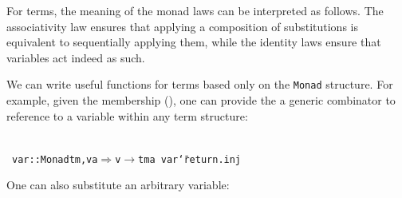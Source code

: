 \documentclass[9pt,authoryear]{sigplanconf}
\begin{document}
%
For terms, the meaning of the monad laws can be interpreted as follows.
    The associativity law ensures that applying a composition of
    substitutions is equivalent to sequentially applying them, while the
    identity laws ensure that variables act indeed as such.%


%
We can write useful functions for terms based only on the \texttt{Monad} structure. 
    For example, given the membership (\texttt{\makebox[1.22ex][c]{$ \in $}}), one can provide the a
    generic combinator to reference to a variable within any term structure{:}%


{\nopagebreak }

%
%
%
~\\~\vphantom{$\{$}\texttt{var}\texttt{\mbox{\hspace{0.50em}}}\texttt{{:}{:}}\texttt{\mbox{\hspace{0.50em}}}\texttt{\makebox[1.22ex][l]{$ {(} $}}\texttt{Monad}\texttt{\mbox{\hspace{0.50em}}}\texttt{tm,}\texttt{\mbox{\hspace{0.50em}}}\texttt{v}\texttt{\mbox{\hspace{0.50em}}}\texttt{\makebox[1.22ex][c]{$ \in $}}\texttt{\mbox{\hspace{0.50em}}}\texttt{a}\texttt{\makebox[1.22ex][r]{$ {)} $}}\texttt{\mbox{\hspace{0.50em}}}\texttt{$ \Rightarrow $}\texttt{\mbox{\hspace{0.50em}}}\texttt{v}\texttt{\mbox{\hspace{0.50em}}}\texttt{$ \rightarrow $}\texttt{\mbox{\hspace{0.50em}}}\texttt{tm}\texttt{\mbox{\hspace{0.50em}}}\texttt{a}\texttt{{\nopagebreak \newline%
}\vphantom{$\{$}}\texttt{var}\texttt{\mbox{\hspace{0.50em}}}\texttt{{\char `\=}}\texttt{\mbox{\hspace{0.50em}}}\texttt{return}\texttt{\mbox{\hspace{0.50em}}}\texttt{.}\texttt{\mbox{\hspace{0.50em}}}\texttt{inj}\texttt{{\nopagebreak \newline%
}\vphantom{$\{$}}%


%
One can also substitute an arbitrary variable{:}%


{\nopagebreak }
\end{document}
